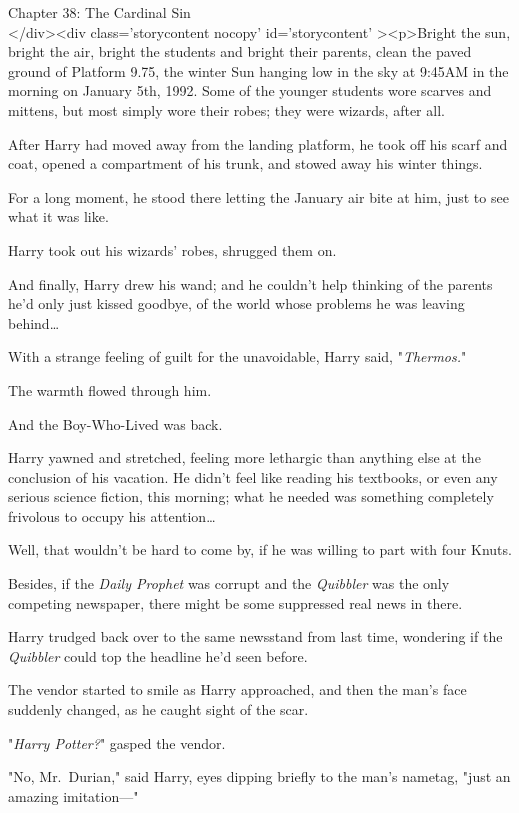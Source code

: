 
Chapter 38: The Cardinal Sin\\
</div><div  class='storycontent nocopy' id='storycontent' ><p>Bright the sun, 
bright the air, bright the students and bright their parents, clean the paved 
ground of Platform 9.75, the winter Sun hanging low in the sky at 9:45AM in the 
morning on January 5th, 1992. Some of the younger students wore scarves and 
mittens, but most simply wore their robes; they were wizards, after all.

After Harry had moved away from the landing platform, he took off his scarf and 
coat, opened a compartment of his trunk, and stowed away his winter things.

For a long moment, he stood there letting the January air bite at him, just to 
see what it was like.

Harry took out his wizards' robes, shrugged them on.

And finally, Harry drew his wand; and he couldn't help thinking of the parents 
he'd only just kissed goodbye, of the world whose problems he was leaving 
behind{\ldots}

With a strange feeling of guilt for the unavoidable, Harry said, 
"\emph{Thermos.}"

The warmth flowed through him.

And the Boy-Who-Lived was back.

Harry yawned and stretched, feeling more lethargic than anything else at the 
conclusion of his vacation. He didn't feel like reading his textbooks, or even 
any serious science fiction, this morning; what he needed was something 
completely frivolous to occupy his attention{\ldots}

Well, that wouldn't be hard to come by, if he was willing to part with four 
Knuts.

Besides, if the \emph{Daily Prophet} was corrupt and the \emph{Quibbler} was 
the only competing newspaper, there might be some suppressed real news in there.

Harry trudged back over to the same newsstand from last time, wondering if the 
\emph{Quibbler} could top the headline he'd seen before.

The vendor started to smile as Harry approached, and then the man's face 
suddenly changed, as he caught sight of the scar.

"\emph{Harry Potter?}" gasped the vendor.

"No, Mr.~Durian," said Harry, eyes dipping briefly to the man's nametag, "just 
an amazing imitation---"

